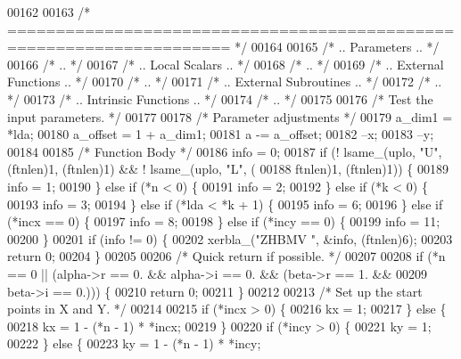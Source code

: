 \begin{DoxyCode}
00162 
00163 \textcolor{comment}{/*  ===================================================================== */}
00164 
00165 \textcolor{comment}{/*     .. Parameters .. */}
00166 \textcolor{comment}{/*     .. */}
00167 \textcolor{comment}{/*     .. Local Scalars .. */}
00168 \textcolor{comment}{/*     .. */}
00169 \textcolor{comment}{/*     .. External Functions .. */}
00170 \textcolor{comment}{/*     .. */}
00171 \textcolor{comment}{/*     .. External Subroutines .. */}
00172 \textcolor{comment}{/*     .. */}
00173 \textcolor{comment}{/*     .. Intrinsic Functions .. */}
00174 \textcolor{comment}{/*     .. */}
00175 
00176 \textcolor{comment}{/*     Test the input parameters. */}
00177 
00178     \textcolor{comment}{/* Parameter adjustments */}
00179     a\_dim1 = *lda;
00180     a\_offset = 1 + a\_dim1;
00181     a -= a\_offset;
00182     --x;
00183     --y;
00184 
00185     \textcolor{comment}{/* Function Body */}
00186     info = 0;
00187     \textcolor{keywordflow}{if} (! lsame\_(uplo, \textcolor{stringliteral}{"U"}, (ftnlen)1, (ftnlen)1) && ! lsame\_(uplo, \textcolor{stringliteral}{"L"}, (
00188         ftnlen)1, (ftnlen)1)) \{
00189     info = 1;
00190     \} \textcolor{keywordflow}{else} \textcolor{keywordflow}{if} (*n < 0) \{
00191     info = 2;
00192     \} \textcolor{keywordflow}{else} \textcolor{keywordflow}{if} (*k < 0) \{
00193     info = 3;
00194     \} \textcolor{keywordflow}{else} \textcolor{keywordflow}{if} (*lda < *k + 1) \{
00195     info = 6;
00196     \} \textcolor{keywordflow}{else} \textcolor{keywordflow}{if} (*incx == 0) \{
00197     info = 8;
00198     \} \textcolor{keywordflow}{else} \textcolor{keywordflow}{if} (*incy == 0) \{
00199     info = 11;
00200     \}
00201     \textcolor{keywordflow}{if} (info != 0) \{
00202     xerbla\_(\textcolor{stringliteral}{"ZHBMV "}, &info, (ftnlen)6);
00203     \textcolor{keywordflow}{return} 0;
00204     \}
00205 
00206 \textcolor{comment}{/*     Quick return if possible. */}
00207 
00208     \textcolor{keywordflow}{if} (*n == 0 || (alpha->r == 0. && alpha->i == 0. && (beta->r == 1. && 
00209                                                          beta->i == 0.))) \{
00210     \textcolor{keywordflow}{return} 0;
00211     \}
00212 
00213 \textcolor{comment}{/*     Set up the start points in  X  and  Y. */}
00214 
00215     \textcolor{keywordflow}{if} (*incx > 0) \{
00216     kx = 1;
00217     \} \textcolor{keywordflow}{else} \{
00218     kx = 1 - (*n - 1) * *incx;
00219     \}
00220     \textcolor{keywordflow}{if} (*incy > 0) \{
00221     ky = 1;
00222     \} \textcolor{keywordflow}{else} \{
00223     ky = 1 - (*n - 1) * *incy;

\end{DoxyCode}
